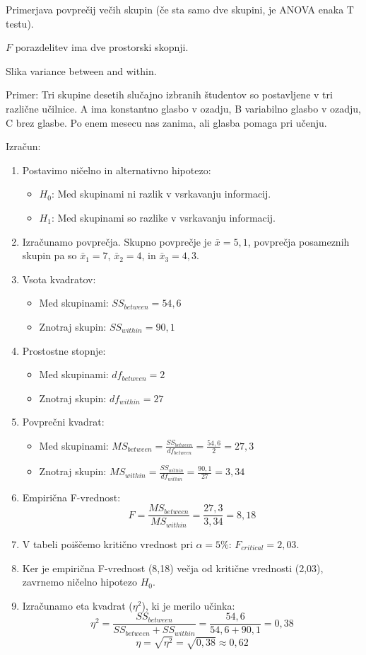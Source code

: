 Primerjava povprečij večih skupin (če sta samo dve skupini, je ANOVA enaka T testu).

$F$ porazdelitev ima dve prostorski skopnji.

Slika variance between and within.

Primer: Tri skupine desetih slučajno izbranih študentov so postavljene v tri različne učilnice. A ima konstantno glasbo v ozadju, B variabilno glasbo v ozadju, C brez glasbe. Po enem mesecu nas zanima, ali glasba pomaga pri učenju.

Izračun:
\begin{enumerate}
    \item Postavimo ničelno in alternativno hipotezo:
        \begin{itemize}
            \item $H_0$: Med skupinami ni razlik v vsrkavanju informacij.
            \item $H_1$: Med skupinami so razlike v vsrkavanju informacij.
        \end{itemize}
    \item Izračunamo povprečja. Skupno povprečje je $\bar{x} = 5,1$, povprečja posameznih skupin pa so $\bar{x}_1 = 7$, $\bar{x}_2 = 4$, in $\bar{x}_3 = 4,3$.
    \item Vsota kvadratov:
        \begin{itemize}
            \item Med skupinami: $SS_{between} = 54,6$
            \item Znotraj skupin: $SS_{within} = 90,1$
        \end{itemize}
    \item Prostostne stopnje:
        \begin{itemize}
            \item Med skupinami: $df_{between} = 2$
            \item Znotraj skupin: $df_{within} = 27$
        \end{itemize}
    \item Povprečni kvadrat:
        \begin{itemize}
            \item Med skupinami: $MS_{between} = \frac{SS_{between}}{df_{between}} = \frac{54,6}{2} = 27,3$
            \item Znotraj skupin: $MS_{within} = \frac{SS_{within}}{df_{within}} = \frac{90,1}{27} = 3,34$
        \end{itemize}
    \item Empirična F-vrednost: 
        \[F = \frac{MS_{between}}{MS_{within}} = \frac{27,3}{3,34} = 8,18\]
    \item V tabeli poiščemo kritično vrednost pri $\alpha = 5\%$: $F_{critical} = 2,03$.
    \item Ker je empirična F-vrednost (8,18) večja od kritične vrednosti (2,03), zavrnemo ničelno hipotezo $H_0$.
    \item Izračunamo eta kvadrat ($\eta^2$), ki je merilo učinka:
        \[\eta^2 = \frac{SS_{between}}{SS_{between} + SS_{within}} = \frac{54,6}{54,6 + 90,1} = 0,38\]
        \[ \eta = \sqrt{\eta^2} = \sqrt{0,38} \approx 0,62\]
\end{enumerate}

